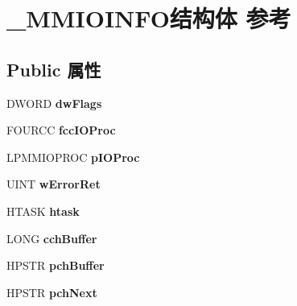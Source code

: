 \hypertarget{struct___m_m_i_o_i_n_f_o}{}\section{\+\_\+\+M\+M\+I\+O\+I\+N\+F\+O结构体 参考}
\label{struct___m_m_i_o_i_n_f_o}
\subsection*{Public 属性}
\begin{DoxyCompactItemize}
\item 
\mbox{\label{struct___m_m_i_o_i_n_f_o_a68b931bbf144bc6df983de4b34c46013}} 
D\+W\+O\+RD {\bfseries dw\+Flags}
\item 
\mbox{\label{struct___m_m_i_o_i_n_f_o_aa4cfa2732506b0b0c7cde4391b1f8fb4}} 
F\+O\+U\+R\+CC {\bfseries fcc\+I\+O\+Proc}
\item 
\mbox{\label{struct___m_m_i_o_i_n_f_o_a007be4284ba68c20f67bb4d3bbf04996}} 
L\+P\+M\+M\+I\+O\+P\+R\+OC {\bfseries p\+I\+O\+Proc}
\item 
\mbox{\label{struct___m_m_i_o_i_n_f_o_ace04ca05459b718715aa344549cf5826}} 
U\+I\+NT {\bfseries w\+Error\+Ret}
\item 
\mbox{\label{struct___m_m_i_o_i_n_f_o_a03f49d2808bca624de7b70551bd054be}} 
H\+T\+A\+SK {\bfseries htask}
\item 
\mbox{\label{struct___m_m_i_o_i_n_f_o_a291128422c728dede5af582e9aa25730}} 
L\+O\+NG {\bfseries cch\+Buffer}
\item 
\mbox{\label{struct___m_m_i_o_i_n_f_o_a84533a773393d63cf9369f17f78d5de6}} 
H\+P\+S\+TR {\bfseries pch\+Buffer}
\item 
\mbox{\label{struct___m_m_i_o_i_n_f_o_a5ccc385534839c3d98708864658a387e}} 
H\+P\+S\+TR {\bfseries pch\+Next}
\item 
\mbox{\label{struct___m_m_i_o_i_n_f_o_a212183ae4ddf18bc9002adfd9539c0ed}} 

\end{DoxyCompactItemize}
